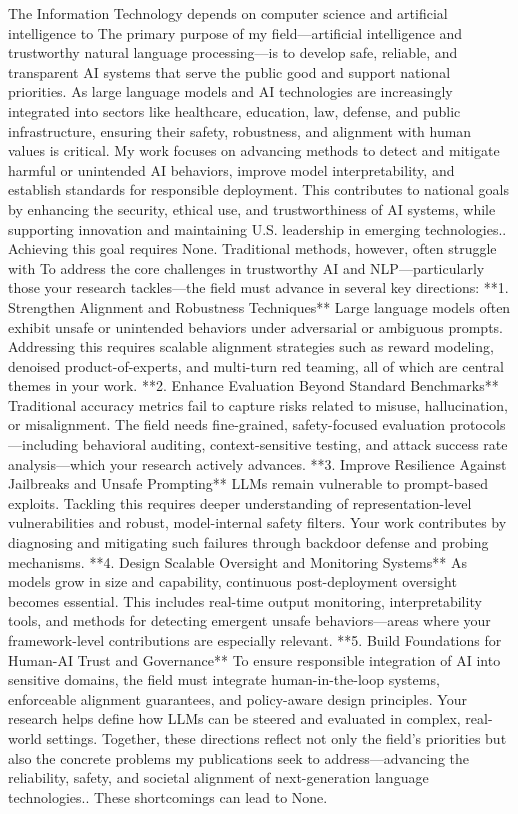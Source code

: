 \documentclass{article}
\begin{document}
The Information Technology depends on computer science and artificial intelligence to The primary purpose of my field—artificial intelligence and trustworthy natural language processing—is to develop safe, reliable, and transparent AI systems that serve the public good and support national priorities. As large language models and AI technologies are increasingly integrated into sectors like healthcare, education, law, defense, and public infrastructure, ensuring their safety, robustness, and alignment with human values is critical. My work focuses on advancing methods to detect and mitigate harmful or unintended AI behaviors, improve model interpretability, and establish standards for responsible deployment. This contributes to national goals by enhancing the security, ethical use, and trustworthiness of AI systems, while supporting innovation and maintaining U.S. leadership in emerging technologies.. Achieving this goal requires None. Traditional methods, however, often struggle with To address the core challenges in trustworthy AI and NLP—particularly those your research tackles—the field must advance in several key directions:  **1. Strengthen Alignment and Robustness Techniques** Large language models often exhibit unsafe or unintended behaviors under adversarial or ambiguous prompts. Addressing this requires scalable alignment strategies such as reward modeling, denoised product-of-experts, and multi-turn red teaming, all of which are central themes in your work.  **2. Enhance Evaluation Beyond Standard Benchmarks** Traditional accuracy metrics fail to capture risks related to misuse, hallucination, or misalignment. The field needs fine-grained, safety-focused evaluation protocols—including behavioral auditing, context-sensitive testing, and attack success rate analysis—which your research actively advances.  **3. Improve Resilience Against Jailbreaks and Unsafe Prompting** LLMs remain vulnerable to prompt-based exploits. Tackling this requires deeper understanding of representation-level vulnerabilities and robust, model-internal safety filters. Your work contributes by diagnosing and mitigating such failures through backdoor defense and probing mechanisms.  **4. Design Scalable Oversight and Monitoring Systems** As models grow in size and capability, continuous post-deployment oversight becomes essential. This includes real-time output monitoring, interpretability tools, and methods for detecting emergent unsafe behaviors—areas where your framework-level contributions are especially relevant.  **5. Build Foundations for Human-AI Trust and Governance** To ensure responsible integration of AI into sensitive domains, the field must integrate human-in-the-loop systems, enforceable alignment guarantees, and policy-aware design principles. Your research helps define how LLMs can be steered and evaluated in complex, real-world settings.  Together, these directions reflect not only the field’s priorities but also the concrete problems my publications seek to address—advancing the reliability, safety, and societal alignment of next-generation language technologies.. These shortcomings can lead to None.
\end{document}

